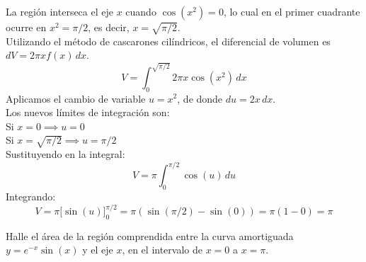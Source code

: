 \documentclass[11pt,paper=a4,answers, addpoints]{exam}
\begin{document}
\begin{questions}
\begin{solution}
La región interseca el eje $x$ cuando $\cos(x^2) = 0$, lo cual en el primer cuadrante ocurre en $x^2 = \pi/2$, es decir, $x = \sqrt{\pi/2}$. \\
Utilizando el método de cascarones cilíndricos, el diferencial de volumen es $dV = 2\pi x f(x) \, dx$.
\[ V = \int_0^{\sqrt{\pi/2}} 2\pi x \cos(x^2) \, dx \]
Aplicamos el cambio de variable $u = x^2$, de donde $du = 2x \, dx$. \\
Los nuevos límites de integración son: \\
Si $x = 0 \implies u = 0$ \\
Si $x = \sqrt{\pi/2} \implies u = \pi/2$ \\
Sustituyendo en la integral:
\[ V = \pi \int_0^{\pi/2} \cos(u) \, du \]
Integrando:
\[ V = \pi \Big[ \sin(u) \Big]_0^{\pi/2} = \pi (\sin(\pi/2) - \sin(0)) = \pi(1 - 0) = \pi \]
\end{solution}

\vspace{5mm}

\question Halle el área de la región comprendida entre la curva amortiguada $y = e^{-x}\sin(x)$ y el eje $x$, en el intervalo de $x = 0$ a $x = \pi$.

\begin{center}
\end{center}


\end{questions}
\end{document}
